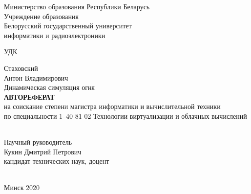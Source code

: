 \begin{titlepage}
    \begin{center}
        Министерство образования Республики Беларусь \\
        Учреждение образования \\
        Белорусский государственный университет \\
        информатики и радиоэлектроники \\[4em]
    \end{center}

    \begin{raggedright}
        \begin{minipage}{4cm}
            УДК\hrulefill{} \\[1em]
        \end{minipage}
    \end{raggedright}

    \begin{center}
        Стаховский \\
        Антон Владимирович \\[6em]

        Динамическая симуляция огня \\[3em]

        \MakeUppercase{\textbf{Автореферат}} \\
        на соискание степени магистра информатики и вычислительной техники \\
        по специальности 1--40 81 02 Технологии виртуализации и облачных вычислений \\ [4em]
    \end{center}

    \hfill
    \begin{raggedleft}
        \begin{minipage}{8cm}
            \hrulefill{} \\[1em]
            Научный руководитель \\[1em]
            Кукин Дмитрий Петрович \\[1em]
            кандидат технических наук, доцент \\[1em]
            \null\hrulefill{} \\[1em]
        \end{minipage}
    \end{raggedleft}

    \vfill
    \begin{center}
        Минск 2020
    \end{center}
\end{titlepage}
